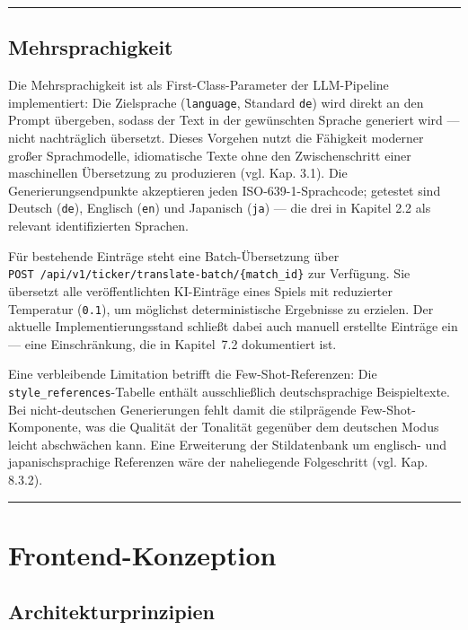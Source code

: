 \begin{center}\rule{0.5\linewidth}{0.5pt}\end{center}

\subsection{Mehrsprachigkeit}\label{mehrsprachigkeit}

Die Mehrsprachigkeit ist als First-Class-Parameter der LLM-Pipeline
implementiert: Die Zielsprache (\texttt{language}, Standard \texttt{de})
wird direkt an den Prompt übergeben, sodass der Text in der gewünschten
Sprache generiert wird --- nicht nachträglich übersetzt. Dieses Vorgehen
nutzt die Fähigkeit moderner großer Sprachmodelle, idiomatische Texte
ohne den Zwischenschritt einer maschinellen Übersetzung zu produzieren
(vgl. Kap. 3.1). Die Generierungsendpunkte akzeptieren jeden
ISO-639-1-Sprachcode; getestet sind Deutsch (\texttt{de}), Englisch
(\texttt{en}) und Japanisch (\texttt{ja}) --- die drei in Kapitel 2.2
als relevant identifizierten Sprachen.

Für bestehende Einträge steht eine Batch-Übersetzung über
\texttt{POST\ /api/v1/ticker/translate-batch/\{match\_id\}} zur
Verfügung. Sie übersetzt alle veröffentlichten KI-Einträge eines Spiels
mit reduzierter Temperatur (\texttt{0.1}), um möglichst deterministische
Ergebnisse zu erzielen. Der aktuelle Implementierungsstand schließt
dabei auch manuell erstellte Einträge ein --- eine Einschränkung, die in
Kapitel~7.2 dokumentiert ist.

Eine verbleibende Limitation betrifft die Few-Shot-Referenzen: Die
\texttt{style\_references}-Tabelle enthält ausschließlich
deutschsprachige Beispieltexte. Bei nicht-deutschen Generierungen fehlt
damit die stilprägende Few-Shot-Komponente, was die Qualität der
Tonalität gegenüber dem deutschen Modus leicht abschwächen kann. Eine
Erweiterung der Stildatenbank um englisch- und japanischsprachige
Referenzen wäre der naheliegende Folgeschritt (vgl. Kap. 8.3.2).

\begin{center}\rule{0.5\linewidth}{0.5pt}\end{center}

\section{Frontend-Konzeption}\label{frontend-konzeption}

\subsection{Architekturprinzipien}\label{architekturprinzipien}

